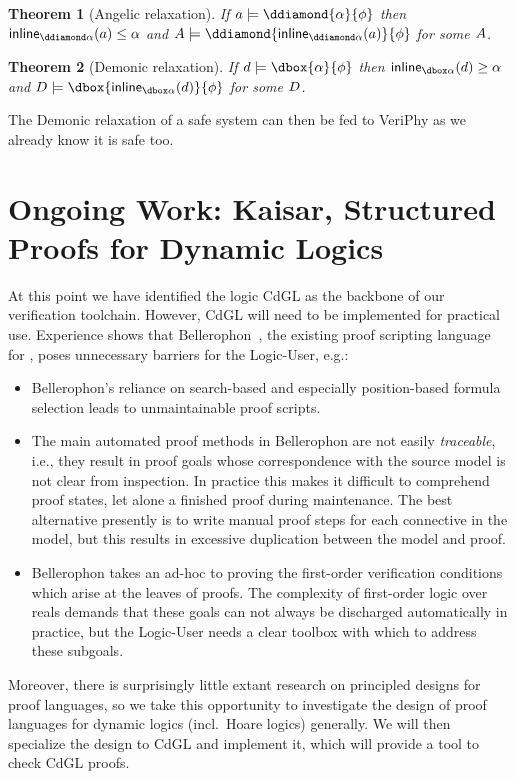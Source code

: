 \documentclass[12pt]{cmuthesis}
\newtheorem{theorem}{Theorem}
\theoremstyle{definition}
\theoremstyle{remark}
\newcommand{\CdGL}{\textsf{CdGL}\xspace}
\newcommand{\VeriPhy}{VeriPhy\xspace}
\begin{document}
\begin{theorem}[Angelic relaxation]
  If $\aa \models \ddiamond{\alpha}{\phi}$ then $\ainline{\alpha}{\aa} \leq \alpha$ and $\ab \models \ddiamond{\ainline{\alpha}{\aa}}{\phi}$ for some $A$.
\end{theorem}
\begin{theorem}[Demonic relaxation]
  If $\da \models \dbox{\alpha}{\phi}$ then $\dinline{\alpha}{\da} \geq \alpha$ and $\db \models \dbox{\dinline{\alpha}{\da}}{\phi}$ for some $D$.
\end{theorem}

The Demonic relaxation of a safe system can then be fed to \VeriPhy as we already know it is safe too.


\chapter{Ongoing Work: Kaisar, Structured Proofs for Dynamic Logics}
\label{ch:kaisar}
At this point we have identified the logic \CdGL as the backbone of our verification toolchain.
However, \CdGL will need to be implemented for practical use.
Experience shows that Bellerophon~\cite{DBLP:conf/itp/FultonMBP17}, the existing proof scripting language for \dGL, poses unnecessary barriers for the Logic-User, e.g.:
\begin{itemize}
\item Bellerophon's reliance on search-based and especially position-based formula selection leads to unmaintainable proof scripts.
\item The main automated proof methods in Bellerophon are not easily \emph{traceable}, i.e., they result in proof goals whose correspondence with the source model is not clear from inspection.
In practice this makes it difficult to comprehend proof states, let alone a finished proof during maintenance.
The best alternative presently is to write manual proof steps for each connective in the model, but this results in excessive duplication between the model and proof.
\item Bellerophon takes an ad-hoc to proving the first-order verification conditions which arise at the leaves of proofs.
The complexity of first-order logic over reals demands that these goals can not always be discharged automatically in practice,
but the Logic-User needs a clear toolbox with which to address these subgoals.
\end{itemize}
Moreover, there is surprisingly little extant research on principled designs for proof languages, so we take this opportunity to investigate the design of proof languages for dynamic logics (incl.\ Hoare logics) generally.
We will then specialize the design to \CdGL and implement it, which will provide a tool to check \CdGL proofs.
\end{document}
